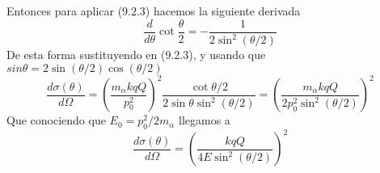 Entonces para aplicar (9.2.3) hacemos la siguiente derivada
\begin{equation} \label{6.1.1}
    \frac{d}{d\theta} \cot\frac{\theta}{2} = -\frac{1}{2 \sin^2 (\theta/2)}
\end{equation} 
De esta forma sustituyendo en (9.2.3), y usando que $sin\theta = 2\sin(\theta/2) \cos(\theta/2)$
\begin{equation} \label{6.1.1}
    \frac{d\sigma(\theta)}{d\Omega} = \left(\frac{m_{\alpha} k qQ}{p_0^2}\right)^2 \frac{\cot\theta/2}{2\sin \theta \sin^2 (\theta/2)} = \left(\frac{m_{\alpha} k qQ}{2p_0^2 \sin^2(\theta/2)}\right)^2
\end{equation} 
Que conociendo que $E_0 = p_0^2/2 m_{\alpha}$ llegamos a 
\begin{equation} \label{6.1.1}
    \frac{d\sigma(\theta)}{d\Omega} = \left(\frac{k qQ}{4 E \sin^2(\theta/2)}\right)^2
\end{equation} 